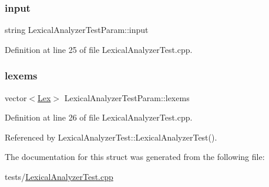 \subsubsection{\texorpdfstring{input}{input}}
{\footnotesize\ttfamily string Lexical\+Analyzer\+Test\+Param\+::input}



Definition at line 25 of file Lexical\+Analyzer\+Test.\+cpp.

\mbox{\label{struct_lexical_analyzer_test_param_a4d683034767e8307cf3bc765e40c93d8}} 
\subsubsection{\texorpdfstring{lexems}{lexems}}
{\footnotesize\ttfamily vector$<$\hyperlink{classteam22_1_1_calc_1_1_lex}{Lex}$>$ Lexical\+Analyzer\+Test\+Param\+::lexems}



Definition at line 26 of file Lexical\+Analyzer\+Test.\+cpp.



Referenced by Lexical\+Analyzer\+Test\+::\+Lexical\+Analyzer\+Test().



The documentation for this struct was generated from the following file\+:\begin{DoxyCompactItemize}
\item 
tests/\hyperlink{_lexical_analyzer_test_8cpp}{Lexical\+Analyzer\+Test.\+cpp}\end{DoxyCompactItemize}
